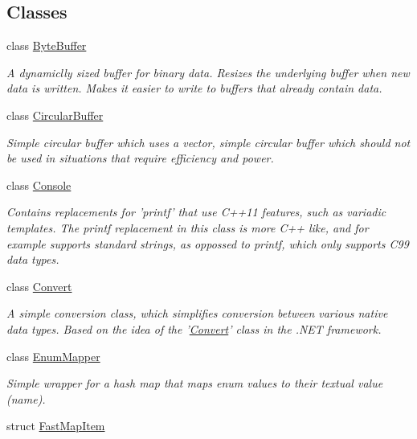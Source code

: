 \subsection*{Classes}
\begin{DoxyCompactItemize}
\item 
class \hyperlink{class_senergy_1_1_byte_buffer}{Byte\-Buffer}
\begin{DoxyCompactList}\small\item\em A dynamiclly sized buffer for binary data. Resizes the underlying buffer when new data is written. Makes it easier to write to buffers that already contain data. \end{DoxyCompactList}\item 
class \hyperlink{class_senergy_1_1_circular_buffer}{Circular\-Buffer}
\begin{DoxyCompactList}\small\item\em Simple circular buffer which uses a vector, simple circular buffer which should not be used in situations that require efficiency and power. \end{DoxyCompactList}\item 
class \hyperlink{class_senergy_1_1_console}{Console}
\begin{DoxyCompactList}\small\item\em Contains replacements for 'printf' that use C++11 features, such as variadic templates. The printf replacement in this class is more C++ like, and for example supports standard strings, as oppossed to printf, which only supports C99 data types. \end{DoxyCompactList}\item 
class \hyperlink{class_senergy_1_1_convert}{Convert}
\begin{DoxyCompactList}\small\item\em A simple conversion class, which simplifies conversion between various native data types. Based on the idea of the '\hyperlink{class_senergy_1_1_convert}{Convert}' class in the .N\-E\-T framework. \end{DoxyCompactList}\item 
class \hyperlink{class_senergy_1_1_enum_mapper}{Enum\-Mapper}
\begin{DoxyCompactList}\small\item\em Simple wrapper for a hash map that maps enum values to their textual value (name). \end{DoxyCompactList}\item 
struct \hyperlink{struct_senergy_1_1_fast_map_item}{Fast\-Map\-Item}

\end{DoxyCompactItemize}
